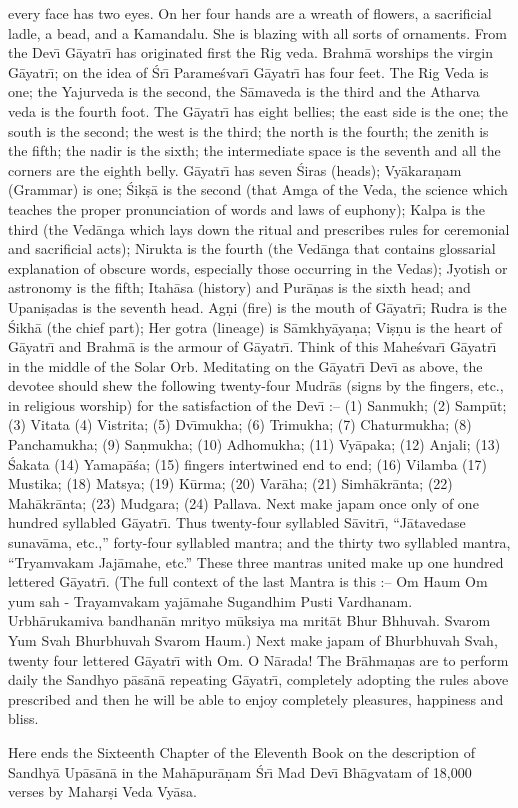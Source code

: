 every face has two eyes. On her four hands are a wreath of flowers, a sacrificial ladle, a bead, and a Kamandalu. She is blazing with all sorts of ornaments. From the Dev\={\i} G\=ayatr\={\i} has originated first the Rig veda. Brahm\=a worships the virgin G\=ayatr\={\i}; on the idea of \'Sr\={\i} Parame\'svar\={\i} G\=ayatr\={\i} has four feet. The Rig Veda is one; the Yajurveda is the second, the S\=amaveda is the third and the Atharva veda is the fourth foot. The G\=ayatr\={\i} has eight bellies; the east side is the one; the south is the second; the west is the third; the north is the fourth; the zenith is the fifth; the nadir is the sixth; the intermediate space is the seventh and all the corners are the eighth belly. G\=ayatr\={\i} has seven \'Siras (heads); Vy\=akara\d{n}am (Grammar) is one; \'Sik\d{s}\=a is the second (that Amga of the Veda, the science which teaches the proper pronunciation of words and laws of euphony); Kalpa is the third (the Ved\=anga which lays down the ritual and prescribes rules for ceremonial and sacrificial acts); Nirukta is the fourth (the Ved\=anga that contains glossarial explanation of obscure words, especially those occurring in the Vedas); Jyotish or astronomy is the fifth; Itah\=asa (history) and Pur\=a\d{n}as is the sixth head; and Upani\d{s}adas is the seventh head. Ag\d{n}i (fire) is the mouth of G\=ayatr\={\i}; Rudra is the \'Sikh\=a (the chief part); Her gotra (lineage) is S\=amkhy\=aya\d{n}a; Vi\d{s}\d{n}u is the heart of G\=ayatr\={\i} and Brahm\=a is the armour of G\=ayatr\={\i}. Think of this Mahe\'svar\={\i} G\=ayatr\={\i} in the middle of the Solar Orb. Meditating on the G\=ayatr\={\i} Dev\={\i} as above, the devotee should shew the following twenty-four Mudr\=as (signs by the fingers, etc., in religious worship) for the satisfaction of the Dev\={\i} :-- (1) Sanmukh; (2) Samp\=ut; (3) Vitata (4) Vistrita; (5) Dv\={\i}mukha; (6) Trimukha; (7) Chaturmukha; (8) Panchamukha; (9) Sa\d{n}mukha; (10) Adhomukha; (11) Vy\=apaka; (12) Anjali; (13) \'Sakata (14) Yamap\=a\'sa; (15) fingers intertwined end to end; (16) Vilamba (17) Mustika; (18) Matsya; (19) K\=urma; (20) Var\=aha; (21) Simh\=akr\=anta; (22) Mah\=akr\=anta; (23) Mudgara; (24) Pallava. Next make japam once only of one hundred syllabled G\=ayatr\={\i}. Thus twenty-four syllabled S\=avitr\={\i}, ``J\=atavedase sunav\=ama, etc.,'' forty-four syllabled mantra; and the thirty two syllabled mantra, ``Tryamvakam Jaj\=amahe, etc.'' These three mantras united make up one hundred lettered G\=ayatr\={\i}. (The full context of the last Mantra is this :-- Om Haum Om yum sah - Trayamvakam yaj\=amahe Sugandhim Pusti Vardhanam. Urbh\=arukamiva bandhan\=an mrityo m\=uksiya ma mrit\=at Bhur Bhhuvah. Svarom Yum Svah Bhurbhuvah Svarom Haum.) Next make japam of Bhurbhuvah Svah, twenty four lettered G\=ayatr\={\i} with Om. O N\=arada! The Br\=ahma\d{n}as are to perform daily the Sandhyo p\=as\=an\=a repeating G\=ayatr\={\i}, completely adopting the rules above prescribed and then he will be able to enjoy completely pleasures, happiness and bliss.

Here ends the Sixteenth Chapter of the Eleventh Book on the description of Sandhy\=a Up\=as\=an\=a in the Mah\=apur\=a\d{n}am \'Sr\={\i} Mad Dev\={\i} Bh\=agvatam of 18,000 verses by Mahar\d{s}i Veda Vy\=asa.



